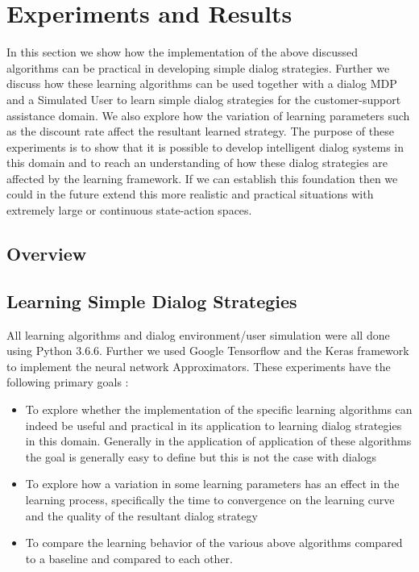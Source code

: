 \documentclass[14pt]{extarticle}
\numberwithin{equation}{section}
\begin{document}
	
	\pagebreak
	\section{Experiments and Results}
	In this section we show how the implementation of the above discussed algorithms can be practical in developing simple dialog strategies. Further we discuss how these learning algorithms can be used together with a dialog MDP and a Simulated User to learn simple dialog strategies for the customer-support assistance domain. We also explore how the variation of  learning parameters such as the discount rate affect the resultant learned strategy. The purpose of these experiments is to show that it is possible to develop intelligent dialog systems in this domain and to reach an understanding of how these dialog strategies are affected by the learning framework. If we can establish this foundation then we could in the future extend this more realistic and practical situations with extremely large or continuous state-action spaces.
	\subsection{Overview}
		\subsection{Learning Simple Dialog Strategies}
	All learning algorithms and dialog environment/user simulation were all done using Python 3.6.6\cite{python}. Further we used Google Tensorflow\cite{tensorflow} and the Keras framework\cite{keras} to implement the neural network Approximators. These experiments have the following primary goals :
	\begin{itemize}
		\item To explore whether the implementation of the specific learning algorithms can indeed be useful and practical in its application to learning dialog strategies in this domain. Generally in the application of application of these algorithms the goal is generally easy to define but this is not the case with dialogs
		\item To explore how a variation in some learning parameters has an effect in the learning process, specifically the time to convergence on the learning curve and the quality of the resultant dialog strategy
		\item To compare the learning behavior of the various above algorithms compared to a baseline and compared to each other.
	\end{itemize}
\end{document}
